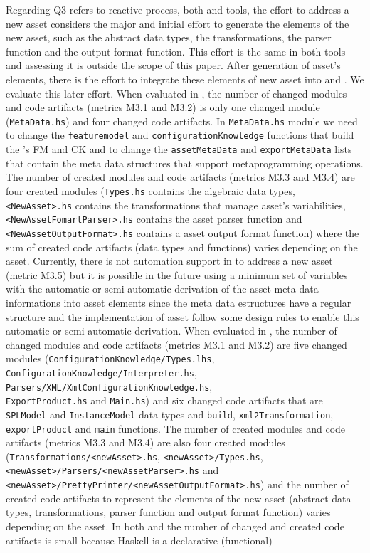 Regarding Q3 refers to reactive process, both \hpl{} and \hp{} tools, the effort to address a new asset considers the major and initial effort to generate the elements of the new asset, such as the abstract data types, the transformations, the parser function and the output format function. This effort is the same in both tools and assessing it is outside the scope of this paper. After generation of asset's elements, there is the effort to integrate these elements of new asset into \hpl{} and \hp{}. We evaluate this later effort.  When evaluated in \hpl{}, the number of changed modules and code artifacts (metrics M3.1 and M3.2) is only one changed module (\texttt{MetaData.hs}) and four changed code artifacts. In \texttt{MetaData.hs} module we need to change the \texttt{featuremodel} and \texttt{configurationKnowledge} functions that build the \hpl's FM and CK and to change the \texttt{assetMetaData} and \texttt{exportMetaData} lists that contain the meta data structures that support metaprogramming operations. The number of created modules and code artifacts (metrics M3.3 and M3.4) are four created modules (\texttt{Types.hs} contains the algebraic data types, \texttt{<NewAsset>.hs} contains the transformations that manage asset's variabilities, \texttt{<NewAssetFomartParser>.hs} contains the asset parser function and \texttt{<NewAssetOutputFormat>.hs} contains a asset output format function) where the sum of created code artifacts (data types and functions) varies depending on the asset.  Currently, there is not automation support in \hpl{} to address a new asset (metric M3.5) but it is possible in the future using a minimum set of variables with the automatic or semi-automatic derivation of the asset meta data informations into asset elements since the meta data estructures have a regular structure and the implementation of asset follow some design rules to enable this automatic or semi-automatic derivation.  When evaluated in \hp{}, the number of changed modules and code artifacts (metrics M3.1 and M3.2) are five changed modules (\texttt{ConfigurationKnowledge/Types.lhs}, \\ \texttt{ConfigurationKnowledge/Interpreter.hs}, \\ \texttt{Parsers/XML/XmlConfigurationKnowledge.hs}, \\ \texttt{ExportProduct.hs} and \texttt{Main.hs}) and six changed code artifacts that are \texttt{SPLModel} and \texttt{InstanceModel} data types and \texttt{build}, \texttt{xml2Transformation}, \texttt{exportProduct} and \texttt{main} functions.  The number of created modules and code artifacts (metrics M3.3 and M3.4) are also four created modules (\texttt{Transformations/<newAsset>.hs}, \texttt{<newAsset>/Types.hs}, \\ \texttt{<newAsset>/Parsers/<newAssetParser>.hs} and \\ \texttt{<newAsset>/PrettyPrinter/<newAssetOutputFormat>.hs}) and the number of created code artifacts to represent the elements of the new asset (abstract data types, transformations, parser function and output format function) varies depending on the asset.  In both \hpl{} and \hp{} the number of changed and created code artifacts is small because Haskell is a declarative (functional) 